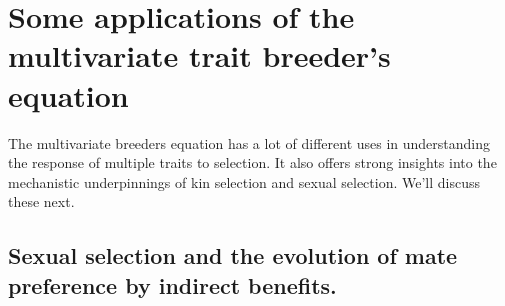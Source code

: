 
\section{Some applications of the multivariate trait breeder's equation}

The multivariate breeders equation has a lot of different uses in
understanding the response of multiple traits to selection. It also
offers strong insights into the mechanistic underpinnings of kin selection and sexual selection. We'll discuss these next.


\subsection{Sexual selection and the evolution of mate preference by indirect benefits. }


